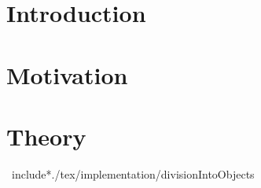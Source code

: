 \documentclass{pracamgr}
\begin{document}
	\setcounter{page}{1}

	\maketitle
	
	

	\tableofcontents
	
	\listoffigures

	\listoftables

	\setcounter{page}{1}


	\chapter*{Introduction}
		
		
	\chapter{ Motivation }\label{motivation}	
			
	
	\chapter{ Theory }\label{theory}	
		
	
	
	\	include*{./tex/implementation/divisionIntoObjects}
		
		

	
	

	
	
\end{document}
